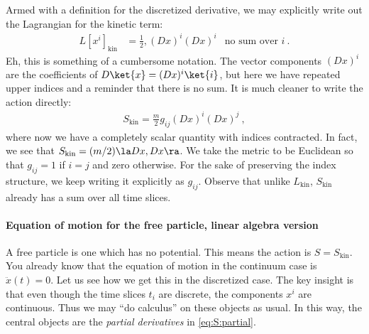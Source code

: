 Armed with a definition for the discretized derivative, we may explicitly write out the Lagrangian for the kinetic term:
\begin{align}
    L[x^i]_\text{kin} &= \frac{1}{2} , (Dx)^i (Dx)^i 
    &
    \text{no sum over }i \ .
\end{align}
Eh, this is something of a cumbersome notation. The vector components $(Dx)^i$ are the coefficients of $D\ket{x} = (Dx)^i\ket{i}$, but here we have repeated upper indices and a reminder that there is no sum. It is much cleaner to write the action directly:
\begin{align}
    S_\text{kin} = \frac{m}{2} g_{ij} (Dx)^i (Dx)^j \ ,
    \label{eq:S:kin:discrete}
\end{align}
where now we have a completely scalar quantity with indices contracted. In fact, we see that $S_\text{kin} = (m/2)\la Dx, Dx \ra$. We take the metric to be Euclidean so that $g_{ij} = 1$ if $i=j$ and zero otherwise. For the sake of preserving the index structure, we keep writing it explicitly as $g_{ij}$. 
% 
Observe that unlike $L_\text{kin}$, $S_\text{kin}$ already has a sum over all time slices. 


\paragraph{Equation of motion for the free particle, linear algebra version} A free particle is one which has no potential. This means the action is $S=S_\text{kin}$. You already know that the equation of motion in the continuum case is $\ddot{x}(t)=0$. Let us see how we get this in the discretized case.  The key insight is that even though the time slices $t_i$ are discrete, the components $x^i$ are continuous. Thus we may ``do calculus'' on these objects as usual. In this way, the central objects are the \emph{partial derivatives} in \eqref{eq:S:partial}.


